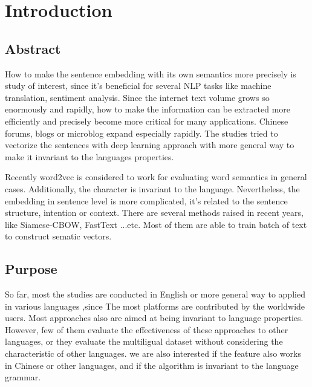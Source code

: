 \chapter{Introduction}
\setlength{\baselineskip}{1.5em}
\setlength{\parindent}{2em}
\setlength{\parskip}{1em}

\section{Abstract}

How to make the sentence embedding with its own semantics more precisely is study of interest, since it's beneficial for several NLP tasks like machine translation, sentiment analysis. 
Since the internet text volume grows so enormously and rapidly, how to make the information can be extracted more efficiently and precisely become more critical for many applications.  
Chinese forums, blogs or microblog expand especially rapidly. The studies tried to vectorize the sentences with deep learning approach with more general way to make it invariant to the languages properties.  


Recently word2vec\cite{word2vec} is considered to work for evaluating word semantics in general cases.  
Additionally, the character is invariant to the language. Nevertheless, 
the embedding in sentence level is more complicated, it's related to the sentence structure,  
intention or context. There are several methods raised in recent years, like Siamese-CBOW, FastText ...etc. 
Most of them are able to train batch of text to construct sematic vectors.

\section{Purpose}

So far, most the studies are conducted in English or more general way to applied in various languages
,since The most platforms are contributed by the worldwide users. Most approaches also are aimed at being invariant to language properties. 
However, few of them evaluate the effectiveness of these approaches to other languages, or they evaluate the multiligual dataset without considering the characteristic of other languages.   
we are also interested if the feature also works in Chinese or other languages, and if the algorithm is invariant to the language grammar. 